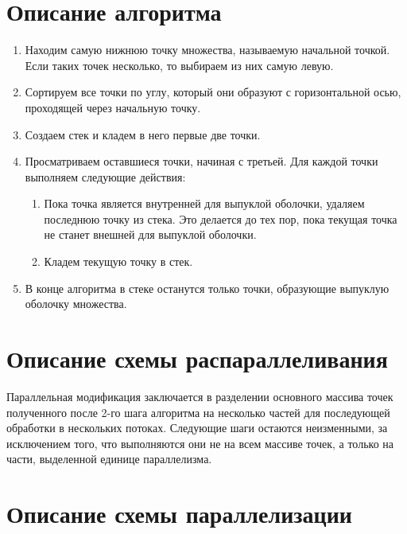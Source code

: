 \documentclass[14pt, a4paper]{extarticle}
\begin{document}
  \section{Описание алгоритма}
  \begin{enumerate}
      \item Находим самую нижнюю точку множества, называемую начальной точкой. Если таких точек несколько, то выбираем из них самую левую.

        \item Сортируем все точки по углу, который они образуют с горизонтальной осью, проходящей через начальную точку.

        \item Создаем стек и кладем в него первые две точки.

        \item Просматриваем оставшиеся точки, начиная с третьей. Для каждой точки выполняем следующие действия:
        
        \begin{enumerate}[label*=\arabic*.]
            \item Пока точка является внутренней для выпуклой оболочки, удаляем последнюю точку из стека. Это делается до тех пор, пока текущая точка не станет внешней для выпуклой оболочки.
            \item Кладем текущую точку в стек.
        \end{enumerate}

        \item В конце алгоритма в стеке останутся только точки, образующие выпуклую оболочку множества.
  \end{enumerate}
  \newpage

  \section{Описание схемы распараллеливания}
  Параллельная модификация заключается в разделении основного массива точек полученного после 2-го шага алгоритма на несколько частей для последующей обработки в нескольких потоках. Следующие шаги остаются неизменными, за исключением того, что выполняются они не на всем массиве точек, а только на части, выделенной единице параллелизма.

  \newpage

  \section{Описание схемы параллелизации}
\end{document}
